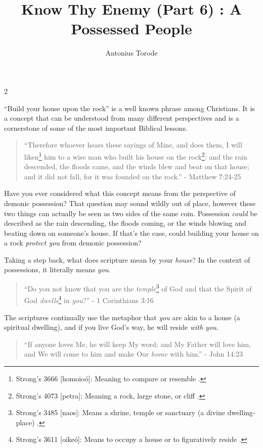 \documentclass[10pt]{article}
\title{Know Thy Enemy (Part 6) 	: A Possessed People}
\author{Antonius Torode}
\begin{document}
\maketitle
\thispagestyle{fancy}



\begin{multicols}{2}

``Build your house upon the rock'' is a well known phrase among Christians. It is a concept that can be understood from many different perspectives and is a cornerstone of some of the most important Biblical lessons.
\begin{quotation}
``Therefore whoever hears these sayings of Mine, and does them, I will liken\footnote{Strong's 3666 [homoioó]: Meaning to compare or resemble \cite{Bible Hub}.} him to a wise man who built his house on the rock\footnote{Strong's 4073 [petra]: Meaning a rock, large stone, or cliff \cite{Bible Hub}.}: and the rain descended, the floods came, and the winds blew and beat on that house; and it did not fall, for it was founded on the rock.'' - Matthew 7:24-25
\end{quotation}
Have you ever considered what this concept means from the perspective of demonic possession? That question may sound wildly out of place, however these two things can actually be seen as two sides of the same coin. Possession \textit{could} be described as the rain descending, the floods coming, or the winds blowing and beating down on someone's house. If that's the case, could building your house on a rock \textit{protect you} from demonic possession?

Taking a step back, what does scripture mean by your \textit{house}? In the context of possessions, it literally means \textit{you}.
\begin{quotation}
``Do you not know that you are the \textit{temple}\footnote{Strong's 3485 [naos]: Means a shrine, temple or sanctuary (a divine dwelling-place) \cite{Bible Hub}.} of God and that the Spirit of God \textit{dwells}\footnote{Strong's 3611 [oikeó]: Means to occupy a house or to figuratively reside \cite{Bible Hub}.} in \textit{you}?'' - 1 Corinthians 3:16
\end{quotation}
The scriptures continually use the metaphor that \textit{you} are akin to a house (a spiritual dwelling), and if you live God's way, he will reside \textit{with you}.
\begin{quotation}
``If anyone loves Me, he will keep My word; and My Father will love him, and We will come to him and make Our \textit{home} with him.'' - John 14:23
\end{quotation}


\end{multicols}
\end{document}
